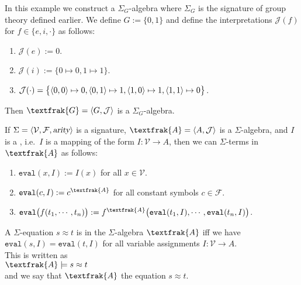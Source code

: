\example
In this example we construct a $\Sigma_G$-algebra where $\Sigma_G$ is the signature of group theory defined
earlier.  We define $G := \{ 0, 1 \}$ and define the interpretations $\mathcal{J}(f)$ for $f \in \{e, i, \cdot
\}$ as follows:
\begin{enumerate}
\item $\mathcal{J}(e) := 0$.
\item $\mathcal{J}(i) := \bigl\{ 0 \mapsto 0, 1 \mapsto 1 \bigr\}$.
\item $\mathcal{J}(\cdot) = \bigl\{ \pair(0,0) \mapsto 0,
                                    \pair(0,1) \mapsto 1,
                                    \pair(1,0) \mapsto 1,
                                    \pair(1,1) \mapsto 0
                            \bigr\}$.
\end{enumerate}
Then $\textfrak{G} = \pair(G, \mathcal{J})$ is a $\Sigma_G$-algebra.  \eoxs

\begin{Definition}
  If $\Sigma = \langle \mathcal{V}, \mathcal{F}, \textsl{arity} \rangle$ is a signature,
  $\textfrak{A} = \pair(A, \mathcal{J})$ is a $\Sigma$-algebra, and $I$ is a , i.e.~$I$
  is a mapping of the form $I:\mathcal{V} \rightarrow A$,
  then we can  $\Sigma$-terms in $\textfrak{A}$ as follows:
  \begin{enumerate}
  \item $\texttt{eval}(x, I) := I(x)$ \quad for all $x \in \mathcal{V}$.
  \item $\texttt{eval}(c, I) := c^\textfrak{A}$ \quad for all constant symbols $c \in \mathcal{F}$.
  \item $\texttt{eval}\bigl(f(t_1,\cdots,t_n)\bigr) := f^\textfrak{A}\bigl(\texttt{eval}(t_1,I),\cdots,\texttt{eval}(t_n,I)\bigr)$.
  \end{enumerate}
  A $\Sigma$-equation $s \approx t$ is  in the $\Sigma$-algebra $\textfrak{A}$ iff we have
  \\[0.2cm]
  \hspace*{1.3cm}
  $\texttt{eval}(s,I) = \texttt{eval}(t,I)$ for all variable assignments $I:\mathcal{V} \rightarrow A$.
  \\[0.2cm]
  This is written as
  \\[0.2cm]
  \hspace*{1.3cm}
  $\textfrak{A} \models s \approx t$
  \\[0.2cm]
  and we say that $\textfrak{A}$  the equation $s \approx t$.
  \eoxs
\end{Definition}

